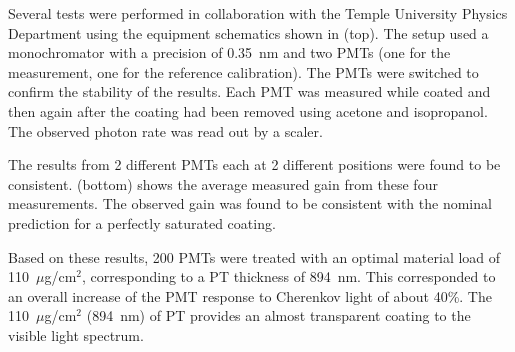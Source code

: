 Several tests were performed in collaboration with the Temple University Physics Department using the equipment
schematics shown in  (top). The setup used a monochromator with a precision
of 0.35~nm and two PMTs (one for the measurement, one for the   reference calibration). The PMTs were switched
to confirm the stability of the results. Each PMT was measured while coated and then again after the coating had
been removed using acetone and isopropanol. The observed photon rate was read out by a scaler.

The results from 2 different PMTs each at 2 different positions were found to be consistent.
 (bottom) shows the average measured gain from these four measurements. The
observed gain was found to be consistent with the nominal prediction for a perfectly saturated coating.

Based on these results, 200 PMTs were treated \cite{Joosten:2016lcl} with an optimal material load of
110~$\mu$g/cm$^2$, corresponding to a PT thickness of 894~nm. This corresponded to an overall increase of the PMT
response to Cherenkov light of about 40\%. The 110~$\mu$g/cm$^2$ (894~nm) of PT provides an almost transparent
coating to the visible light spectrum.
